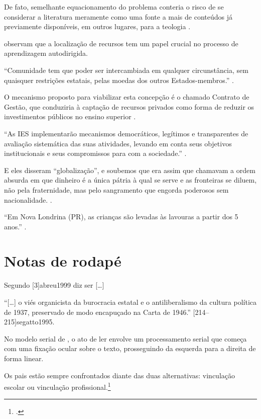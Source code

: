 \documentclass[a4paper]{article}
\begin{document}
De fato, semelhante equacionamento do problema conteria o risco de se
considerar a literatura meramente como uma fonte a mais de conteúdos já
previamente disponíveis, em outros lugares, para a teologia
\cite[3]{jossua1976}.

\textcite{merriam1991} observam que a localização de recursos tem um papel
crucial no processo de aprendizagem autodirigida.

\enquote{Comunidade tem que poder ser intercambiada em qualquer circunstância,
sem quaisquer restrições estatais, pelas moedas dos outros Estados-membros.}
\cite[34]{comissao1992}.

O mecanismo proposto para viabilizar esta concepção é o chamado Contrato de
Gestão, que conduziria à captação de recursos privados como forma de reduzir
os investimentos públicos no ensino superior \cite{brasil1995}.

\enquote{As IES implementarão mecanismos democráticos, legítimos
e transparentes de avaliação sistemática das suas atividades, levando em conta
seus objetivos institucionais e seus compromissos para com a sociedade.}
\cite[55]{anteprojeto1987}.

E eles disseram \enquote{globalização}, e soubemos que era assim que chamavam
a ordem absurda em que dinheiro é a única pátria à qual se serve e as
fronteiras se diluem, não pela fraternidade, mas pelo sangramento que engorda
poderosos sem nacionalidade. \cite[4]{aflor1995}.

\enquote{Em Nova Londrina (PR), as crianças são levadas às lavouras a partir
dos 5 anos.} \cite[12]{noscanaviais1995}.


\section{Notas de rodapé}

Segundo [3]{abreu1999} diz ser [\ldots]

\enquote{[\ldots] o viés organicista da burocracia estatal e o antiliberalismo
da cultura política de 1937, preservado de modo encapuçado na Carta de 1946.}
[214--215]{segatto1995}.

No modelo serial de , o ato de ler envolve um
processamento serial que começa com uma fixação ocular sobre o texto,
prosseguindo da esquerda para a direita de forma linear.

\setcounter{footnote}{3}
Os pais estão sempre confrontados diante das duas alternativas: vinculação
escolar ou vinculação profissional.\footcite[Sobre essa opção dramática, ver
também][269--290]{morice1996}
\end{document}
